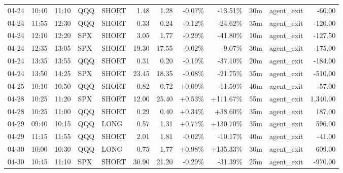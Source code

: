 \documentclass[11pt,a4paper,twoside]{article}
\begin{document}
\begin{center}
\begin{longtable}{>{\color{txtmain}}l l l l l r r r r r >{\color{txtmain}}l r}
04-24 & 10:40 & 11:10 & QQQ & SHORT & 1.48 & 1.28 & \textcolor{lossred}{-0.07\%} & \textcolor{lossred}{-13.51\%} & 30m & agent\_exit & \textcolor{lossred}{-60.00} \\
04-24 & 11:55 & 12:30 & QQQ & SHORT & 0.33 & 0.24 & \textcolor{lossred}{-0.12\%} & \textcolor{lossred}{-24.62\%} & 35m & agent\_exit & \textcolor{lossred}{-120.00} \\
04-24 & 12:10 & 12:20 & SPX & SHORT & 3.05 & 1.77 & \textcolor{lossred}{-0.29\%} & \textcolor{lossred}{-41.80\%} & 10m & agent\_exit & \textcolor{lossred}{-127.50} \\
04-24 & 12:35 & 13:05 & SPX & SHORT & 19.30 & 17.55 & \textcolor{lossred}{-0.02\%} & \textcolor{lossred}{-9.07\%} & 30m & agent\_exit & \textcolor{lossred}{-175.00} \\
04-24 & 13:35 & 13:55 & QQQ & SHORT & 0.31 & 0.20 & \textcolor{lossred}{-0.19\%} & \textcolor{lossred}{-37.10\%} & 20m & agent\_exit & \textcolor{lossred}{-184.00} \\
04-24 & 13:50 & 14:25 & SPX & SHORT & 23.45 & 18.35 & \textcolor{lossred}{-0.08\%} & \textcolor{lossred}{-21.75\%} & 35m & agent\_exit & \textcolor{lossred}{-510.00} \\
04-25 & 10:10 & 10:50 & QQQ & SHORT & 0.82 & 0.72 & \textcolor{wingreen}{+0.09\%} & \textcolor{lossred}{-11.59\%} & 40m & agent\_exit & \textcolor{lossred}{-57.00} \\
04-28 & 10:25 & 11:20 & SPX & SHORT & 12.00 & 25.40 & \textcolor{wingreen}{+0.53\%} & \textcolor{wingreen}{+111.67\%} & 55m & agent\_exit & \textcolor{wingreen}{1,340.00} \\
04-28 & 10:25 & 11:00 & QQQ & SHORT & 0.29 & 0.40 & \textcolor{wingreen}{+0.34\%} & \textcolor{wingreen}{+38.60\%} & 35m & agent\_exit & \textcolor{wingreen}{187.00} \\
04-29 & 09:40 & 10:15 & QQQ & LONG & 0.57 & 1.31 & \textcolor{wingreen}{+0.77\%} & \textcolor{wingreen}{+130.70\%} & 35m & agent\_exit & \textcolor{wingreen}{596.00} \\
04-29 & 11:15 & 11:55 & QQQ & SHORT & 2.01 & 1.81 & \textcolor{lossred}{-0.02\%} & \textcolor{lossred}{-10.17\%} & 40m & agent\_exit & \textcolor{lossred}{-41.00} \\
04-30 & 10:00 & 10:30 & QQQ & LONG & 0.75 & 1.77 & \textcolor{wingreen}{+0.98\%} & \textcolor{wingreen}{+135.33\%} & 30m & agent\_exit & \textcolor{wingreen}{609.00} \\
04-30 & 10:45 & 11:10 & SPX & SHORT & 30.90 & 21.20 & \textcolor{lossred}{-0.29\%} & \textcolor{lossred}{-31.39\%} & 25m & agent\_exit & \textcolor{lossred}{-970.00} \\

\end{longtable}
\end{center}
\end{document}
